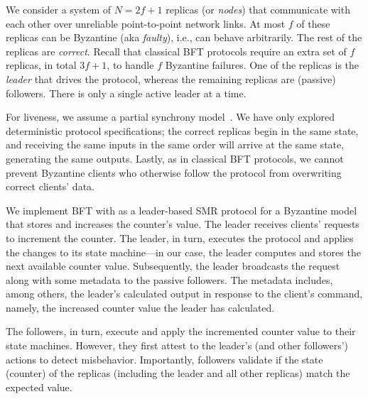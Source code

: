  We consider a system of $N=2f+1$ replicas (or {\em nodes}) that communicate with each other over unreliable point-to-point network links. At most $f$ of these replicas can be Byzantine (aka {\em faulty}), i.e., can behave arbitrarily. The rest of the replicas are {\em correct}. Recall that classical BFT protocols require an extra set of $f$ replicas, in total $3f+1$, to handle $f$ Byzantine failures.  One of the replicas is the {\em leader} that drives the protocol, whereas the remaining replicas are (passive) followers. There is only a single active leader at a time.

For liveness, we assume a partial synchrony model~\cite{FLP, 10.1145/226643.226647}. We have only explored deterministic protocol specifications; the correct replicas begin in the same state, and receiving the same inputs in the same order will arrive at the same state, generating the same outputs. Lastly, as in classical BFT protocols, we cannot prevent Byzantine clients who otherwise follow the protocol from overwriting correct clients' data.


 We implement BFT with \projecttitle{} as a leader-based SMR protocol for a Byzantine model that stores and increases the counter's value. The leader receives clients' requests to increment the counter. The leader, in turn, executes the protocol and applies the changes to its state machine---in our case, the leader computes and stores the next available counter value. Subsequently, the leader broadcasts the request along with some metadata to the passive followers. The metadata includes, among others, the leader's calculated output in response to the client's command, namely, the increased counter value the leader has calculated.

The followers, in turn, execute and apply the incremented counter value to their state machines. However, they first attest to the leader's (and other followers') actions to detect misbehavior. Importantly, followers validate if the state (counter) of the replicas (including the leader and all other replicas) match the expected value.



